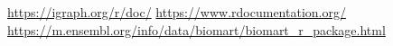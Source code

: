 \url{https://igraph.org/r/doc/}
\url{https://www.rdocumentation.org/}
\url{https://m.ensembl.org/info/data/biomart/biomart_r_package.html}
